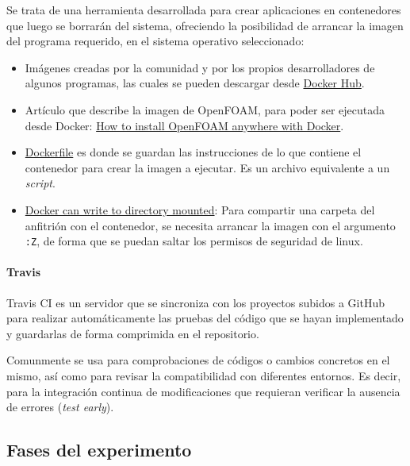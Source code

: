 Se trata de una herramienta desarrollada para crear aplicaciones en
contenedores que luego se borrarán del sistema, ofreciendo la
posibilidad de arrancar la imagen del programa requerido, en el sistema
operativo seleccionado:\\

\begin{itemize}
\item
  Imágenes creadas por la comunidad y por los propios desarrolladores de
  algunos programas, las cuales se pueden descargar desde
  \href{https://hub.docker.com}{Docker Hub}.
\item
  Artículo que describe la imagen de OpenFOAM, para poder ser ejecutada
  desde Docker:
  \href{https://www.cfdengine.com/blog/how-to-install-openfoam-anywhere-with-docker/}{How
  to install OpenFOAM anywhere with Docker}.
\item
  \href{https://hub.docker.com/r/quantumhpc/openfoam/~/dockerfile/}{Dockerfile}
  es donde se guardan las instrucciones de lo que contiene el contenedor
  para crear la imagen a ejecutar. Es un archivo equivalente a un
  \emph{script}.
\item
  \href{http://stackoverflow.com/questions/32001523/docker-cant-write-to-directory-mounted-using-v-unless-it-has-777-permissions}{Docker
  can write to directory mounted}: Para compartir una carpeta del
  anfitrión con el contenedor, se necesita arrancar la imagen con el
  argumento \texttt{:Z}, de forma que se puedan saltar los permisos de
  seguridad de linux.
\end{itemize}

\paragraph{Travis}\label{header-n414}

Travis CI es un servidor que se sincroniza con los proyectos subidos a
GitHub para realizar automáticamente las pruebas del código que se hayan
implementado y guardarlas de forma comprimida en el repositorio.

Comunmente se usa para comprobaciones de códigos o cambios concretos en
el mismo, así como para revisar la compatibilidad con diferentes
entornos. Es decir, para la integración continua de modificaciones que
requieran verificar la ausencia de errores (\emph{test early}).

\subsection{Fases del experimento}\label{header-n420}

